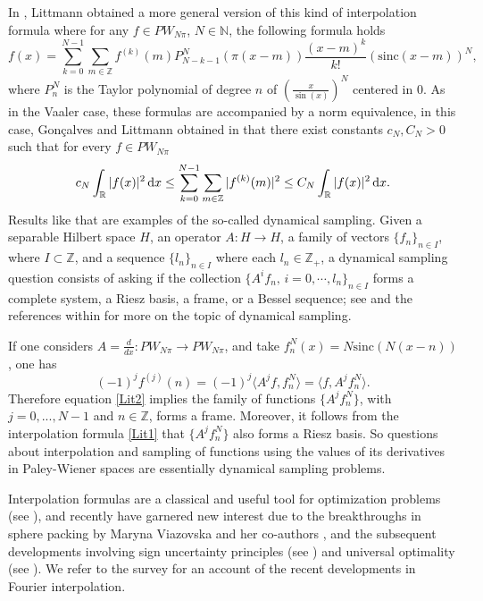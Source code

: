 \documentclass[reqno]{amsart}
\theoremstyle{plain}
\theoremstyle{definition}
\numberwithin{equation}{section}
\newcommand{\Z}{{\mathbb Z}}
\newcommand{\R}{{\mathbb R}}
\newcommand{\N}{{\mathbb N}}
\newcommand{\dx}{\, \mathrm{d}x}
\newcommand{\pa}[1]{\left(#1\right)}
\renewcommand{\dx}{\,\text{\rm d}x}
\newcommand{\sinc}{\mathrm{sinc}}
\begin{document}
In \cite{Li2003}, Littmann obtained a more general version of this kind of interpolation formula where for any $f\in PW_{N\pi}$, $N\in\N$, the following formula holds
\begin{equation}\label{Lit1}
    f(x)=\sum_{k=0}^{N-1} \sum_{m\in\Z} f^{(k)}(m) P^N_{N-k-1}\pa{\pi(x-m)} \frac{(x-m)^k}{k!} \pa{\sinc(x-m)}^N,
\end{equation}
where $P^N_n$ is the Taylor polynomial of degree $n$ of $\pa{\frac{x}{\sin(x)}}^N$ centered in 0. As in the Vaaler case, these formulas are accompanied by a norm equivalence, in this case, Gonçalves and Littmann obtained in \cite{GL2015} that there exist constants $c_N,C_N>0$ such that for every $f\in PW_{N\pi}$
\begin{equation}\label{Lit2}
    c_N\int_\R |f(x)|^2\dx \leq\sum_{k=0}^{N-1}\sum_{m\in\Z}|f^{(k)}(m)|^2 \leq C_N\int_\R |f(x)|^2\dx.
\end{equation}
Results like that are examples of the so-called dynamical sampling. Given a separable Hilbert space $H$, an operator $A:H\rightarrow H$, a family of vectors $\{f_n\}_{n\in I}$, where $I\subset \Z$, and a 
sequence $\{l_n\}_{n\in I}$ where each $l_n\in \Z_+$, a dynamical sampling question consists of asking if the collection $\{A^{i}f_n,\,i=0,\cdots,l_n\}_{n\in I}$ forms a complete system, a Riesz basis, a frame, or a Bessel sequence; see \cite{ACMT2014,ADK2013,CMPP2017} and the references within for more on the topic of dynamical sampling. 

If one considers $A=\frac{d}{dx}:PW_{N\pi}\rightarrow PW_{N\pi}$, and take $f_n^N(x)=N\sinc(N(x-n))$, 
one has
$$(-1)^j f^{(j)}(n) = (-1)^j \langle A^j f, f^N_n \rangle =  \langle f, A^j f^N_n \rangle.$$
Therefore equation \eqref{Lit2} implies the family of functions $\{A^j f^N_n\}$, with $j=0,...,N-1$ 
and $n\in\Z$, forms a frame. Moreover, it follows from the interpolation formula \eqref{Lit1} that 
$\{A^j f^N_n\}$ also forms a Riesz basis. So questions about interpolation and sampling of functions using the values of its derivatives in Paley-Wiener spaces are essentially dynamical sampling problems. 

{Interpolation formulas are a classical and useful tool for optimization problems (see \cite{Va1985}), and recently have garnered new interest due to the breakthroughs in sphere packing by Maryna Viazovska and her co-authors \cite{CKMRV17,Via17}, and the subsequent developments involving sign uncertainty principles (see \cite{CG19}) and universal optimality (see \cite{CKMRV22}). We refer to the survey \cite{Cohn24} for an account of the recent developments in Fourier interpolation.}
\end{document}
